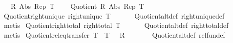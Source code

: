 \begin{isabellebody}
\begin{isamarkuptext}
\end{isamarkuptext}\isamarkuptrue%
\isamarkupfalse%
\isanewline
\ \ \ R\ Abs\ Rep\ T\isanewline
\ \ \ {}{\isacharcolon}{\kern0pt}\ {\isachardoublequoteopen}Quotient\ R\ Abs\ Rep\ T{\isachardoublequoteclose}\isanewline
{}\isanewline
\isanewline
{}\isamarkupfalse%
\ Quotient{\isacharunderscore}{\kern0pt}right{\isacharunderscore}{\kern0pt}unique{\isacharcolon}{\kern0pt}\ {\isachardoublequoteopen}right{\isacharunderscore}{\kern0pt}unique\ T{\isachardoublequoteclose}\isanewline
%
\isadelimproof
\ \ %
\endisadelimproof
%
\isatagproof
{}\isamarkupfalse%
\ {}\ \isamarkupfalse%
\ Quotient{\isacharunderscore}{\kern0pt}alt{\isacharunderscore}{\kern0pt}def\ right{\isacharunderscore}{\kern0pt}unique{\isacharunderscore}{\kern0pt}def\ \isamarkupfalse%
\ metis%
\endisatagproof
{\isafoldproof}%
%
\isadelimproof
\isanewline
%
\endisadelimproof
\isanewline
{}\isamarkupfalse%
\ Quotient{\isacharunderscore}{\kern0pt}right{\isacharunderscore}{\kern0pt}total{\isacharcolon}{\kern0pt}\ {\isachardoublequoteopen}right{\isacharunderscore}{\kern0pt}total\ T{\isachardoublequoteclose}\isanewline
%
\isadelimproof
\ \ %
\endisadelimproof
%
\isatagproof
{}\isamarkupfalse%
\ {}\ \isamarkupfalse%
\ Quotient{\isacharunderscore}{\kern0pt}alt{\isacharunderscore}{\kern0pt}def\ right{\isacharunderscore}{\kern0pt}total{\isacharunderscore}{\kern0pt}def\ \isamarkupfalse%
\ metis%
\endisatagproof
{\isafoldproof}%
%
\isadelimproof
\isanewline
%
\endisadelimproof
\isanewline
{}\isamarkupfalse%
\ Quotient{\isacharunderscore}{\kern0pt}rel{\isacharunderscore}{\kern0pt}eq{\isacharunderscore}{\kern0pt}transfer{\isacharcolon}{\kern0pt}\ {\isachardoublequoteopen}{\isacharparenleft}{\kern0pt}T\ {\isacharequal}{\kern0pt}{\isacharequal}{\kern0pt}{\isacharequal}{\kern0pt}{\isachargreater}{\kern0pt}\ T\ {\isacharequal}{\kern0pt}{\isacharequal}{\kern0pt}{\isacharequal}{\kern0pt}{\isachargreater}{\kern0pt}\ {\isacharparenleft}{\kern0pt}{\isacharequal}{\kern0pt}{\isacharparenright}{\kern0pt}{\isacharparenright}{\kern0pt}\ R\ {\isacharparenleft}{\kern0pt}{\isacharequal}{\kern0pt}{\isacharparenright}{\kern0pt}{\isachardoublequoteclose}\isanewline
%
\isadelimproof
\ \ %
\endisadelimproof
%
\isatagproof
{}\isamarkupfalse%
\ {}\ \isamarkupfalse%
\ Quotient{\isacharunderscore}{\kern0pt}alt{\isacharunderscore}{\kern0pt}def\ rel{\isacharunderscore}{\kern0pt}fun{\isacharunderscore}{\kern0pt}def\ \isamarkupfalse%

\end{isabellebody}
